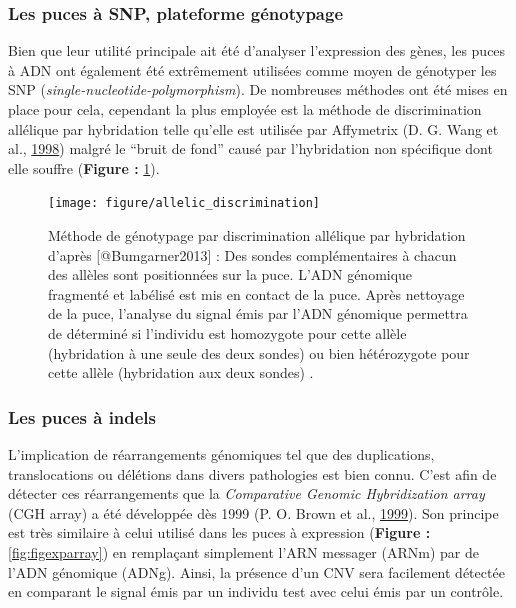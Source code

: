 \documentclass[12pt,twoside]{reedthesis}
\theoremstyle{definition}
\theoremstyle{definition}
\theoremstyle{remark}
\begin{document}
  \newpage
  
  \subsubsection{Les puces à SNP, plateforme
  génotypage}\label{les-puces-a-snp-plateforme-genotypage}
  
  Bien que leur utilité principale ait été d'analyser l'expression des
  gènes, les puces à ADN ont également été extrêmement utilisées comme
  moyen de génotyper les SNP (\emph{single-nucleotide-polymorphism}). De
  nombreuses méthodes ont été mises en place pour cela, cependant la plus
  employée est la méthode de discrimination allélique par hybridation
  telle qu'elle est utilisée par Affymetrix (D. G. Wang et al.,
  \protect\hyperlink{ref-Wang1998}{1998}) malgré le ``bruit de fond''
  causé par l'hybridation non spécifique dont elle souffre (\textbf{Figure
  :} \ref{fig:figallelicdisc}).
  
  \begin{figure}
  
  {\centering \texttt{[image: figure/allelic\_discrimination]} 
  
  }
  
  \caption[Méthode de génotypage par discrimination allélique par hybridation]{Méthode de génotypage par discrimination allélique par hybridation d'après [@Bumgarner2013] : Des sondes complémentaires à chacun des allèles sont positionnées sur la puce. L'ADN génomique fragmenté et labélisé est mis en contact de la puce. Après nettoyage de la puce, l'analyse du signal émis par l'ADN génomique permettra de déterminé si l'individu est homozygote pour cette allèle (hybridation à une seule des deux sondes) ou bien hétérozygote pour cette allèle (hybridation aux deux sondes) .}\label{fig:figallelicdisc}
  \end{figure}
  
  \newpage
  
  \subsubsection{Les puces à indels}\label{les-puces-a-indels}
  
  L'implication de réarrangements génomiques tel que des duplications,
  translocations ou délétions dans divers pathologies est bien connu.
  C'est afin de détecter ces réarrangements que la \emph{Comparative
  Genomic Hybridization array} (CGH array) a été développée dès 1999 (P.
  O. Brown et al., \protect\hyperlink{ref-Brown1999}{1999}). Son principe
  est très similaire à celui utilisé dans les puces à expression
  (\textbf{Figure :} \ref{fig:figexparray}) en remplaçant simplement l'ARN
  messager (ARNm) par de l'ADN génomique (ADNg). Ainsi, la présence d'un
  CNV sera facilement détectée en comparant le signal émis par un individu
  test avec celui émis par un contrôle.
  
\end{document}
